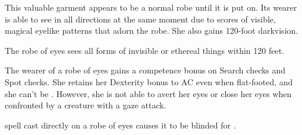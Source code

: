 \begin{comment}
Robe of Bones: This handy item functions much like a robe of useful items for the serious necromancer. It appears to be an unremarkable robe, but a character who dons it notes that it is adorned with small embroidered figures representing undead creatures. Only the wearer of the robe can see the embroidery and recognize them for the creatures they become, and detach them. One figure can be detached each round. Detaching a figure causes it to become an actual undead creature (see the list below). The skeleton or zombie is not under the control of the wearer of the robe, but may be subsequently commanded, rebuked, turned, or destroyed. A newly created robe of bones always has two embroidered figures of each of the following undead:
\begin{itemize}
\item Small goblin skeleton
\item Medium human commoner skeleton
\item Medium wolf skeleton
\item Small goblin zombie
\item Medium human commoner zombie
\item Medium wolf zombie
\end{itemize}

Moderate necromancy [evil]; CL 6th; Craft Wondrous Item, animate dead; Price 2,400 gp; Weight 1 lb.
\end{comment}
 This valuable garment appears to be a normal robe until it is put on. Its wearer is able to see in all directions at the same moment due to scores of visible, magical eyelike patterns that adorn the robe. She also gains 120-foot darkvision.

The robe of eyes sees all forms of invisible or ethereal things within 120 feet.

The wearer of a robe of eyes gains a  competence bonus on Search checks and Spot checks. She retains her Dexterity bonus to AC even when flat-footed, and she can't be . However, she is not able to avert her eyes or close her eyes when confronted by a creature with a gaze attack.

 spell cast directly on a robe of eyes causes it to be blinded for .

